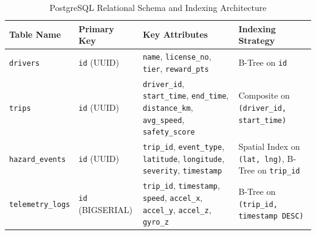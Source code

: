 \begin{table}[H]
\centering
\small
\caption{PostgreSQL Relational Schema and Indexing Architecture}
\label{tab:db_schema}
\begin{tabularx}{\textwidth}{llp{5.5cm}l}
\toprule
\textbf{Table Name} & \textbf{Primary Key} & \textbf{Key Attributes} & \textbf{Indexing Strategy} \\
\midrule
\texttt{drivers} & \texttt{id} (UUID) & \texttt{name}, \texttt{license\_no}, \texttt{tier}, \texttt{reward\_pts} & B-Tree on \texttt{id} \\
\addlinespace
\texttt{trips} & \texttt{id} (UUID) & \texttt{driver\_id}, \texttt{start\_time}, \texttt{end\_time}, \texttt{distance\_km}, \texttt{avg\_speed}, \texttt{safety\_score} & Composite on \texttt{(driver\_id, start\_time)} \\
\addlinespace
\texttt{hazard\_events} & \texttt{id} (UUID) & \texttt{trip\_id}, \texttt{event\_type}, \texttt{latitude}, \texttt{longitude}, \texttt{severity}, \texttt{timestamp} & Spatial Index on \texttt{(lat, lng)}, B-Tree on \texttt{trip\_id} \\
\addlinespace
\texttt{telemetry\_logs} & \texttt{id} (BIGSERIAL) & \texttt{trip\_id}, \texttt{timestamp}, \texttt{speed}, \texttt{accel\_x}, \texttt{accel\_y}, \texttt{accel\_z}, \texttt{gyro\_z} & B-Tree on \texttt{(trip\_id, timestamp DESC)} \\
\bottomrule
\end{tabularx}
\end{table}
